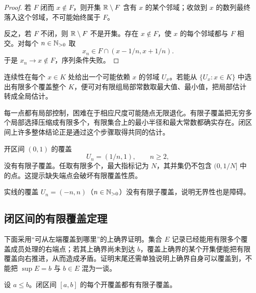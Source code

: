 \begin{proof}
若 \(F\) 闭而 \(x\notin F\)，则开集 \(\mathbb{R}\setminus F\) 含有 \(x\) 的某个邻域；收敛到 \(x\) 的数列最终落入这个邻域，不可能始终属于 \(F\)。

反之，若 \(F\) 不闭，则 \(\mathbb{R}\setminus F\) 不是开集。存在 \(x\notin F\)，使 \(x\) 的每个邻域都与 \(F\) 相交。对每个 \(n\in\mathbb{N}_{>0}\) 取
\[
 x_n\in F\cap(x-1/n,x+1/n).
\]
于是 \(x_n\to x\notin F\)，序列条件失败。
\end{proof}

连续性在每个 \(x\in K\) 处给出一个可能依赖 \(x\) 的邻域 \(U_x\)。若能从 \(\{U_x:x\in K\}\) 中选出有限多个覆盖整个 \(K\)，便可对有限组局部常数取最大值、最小值，把局部估计转成全局估计。

每一点都有局部控制，困难在于相应尺度可能随点无限退化。有限子覆盖把无穷多个局部选择压缩成有限多个，有限集合上的最小半径和最大常数都确实存在。闭区间上许多整体结论正是通过这个步骤取得共同的估计。

\begin{counterexample}
开区间 \((0,1)\) 的覆盖
\[
 U_n=(1/n,1),\qquad n\ge2,
\]
没有有限子覆盖。任取有限多个，最大指标记为 \(N\)，其并集仍不包含 \((0,1/N]\) 中的点。这提示缺失端点会破坏有限覆盖性质。
\end{counterexample}

\begin{counterexample}
实线的覆盖 \(U_n=(-n,n)\)（\(n\in\mathbb{N}_{>0}\)）没有有限子覆盖，说明无界性也是障碍。
\end{counterexample}

\subsection{闭区间的有限覆盖定理}

下面采用“可从左端覆盖到哪里”的上确界证明。集合 \(E\) 记录已经能用有限多个覆盖成员处理的右端点；若其上确界尚未到达 \(b\)，覆盖上确界的某个开集便能把有限覆盖向右推进，从而造成矛盾。证明末尾还需单独说明上确界自身可以覆盖到，不能把 \(\sup E=b\) 与 \(b\in E\) 混为一谈。

\begin{theorem}
设 \(a\le b\)。闭区间 \([a,b]\) 的每个开覆盖都有有限子覆盖。
\end{theorem}

